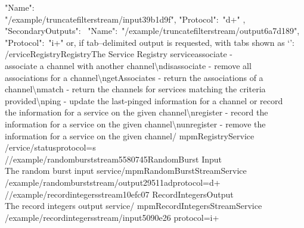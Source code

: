 \textbraceleft{} "Name":\ \\
"/example/truncatefilterstream/input\textunderscore{}39b1d9f", "Protocol":\ "d+"
\textbraceright{} \closeSq,\\
"SecondaryOutputs":\ \openSq{} \textbraceleft{} "Name":\
"/example/truncatefilterstream/output\textunderscore{}6a7d189", "Protocol":\ "i+"
\textbraceright{} \closeSq{} \textbraceright{} \closeSq
\outputEnd{}
or, if tab--delimited output is requested, with tabs shown as
`\texttt{\boldmath{$\vdash$}}':
\outputBegin{}
/\textdollar{}ervice\pseudotab{}Registry\pseudotab{}Registry\pseudotab{}The Service
Registry service\pseudotab{}associate - \\
associate a channel with another channel\textbackslash{}ndisassociate - remove all\\
associations for a channel\textbackslash{}ngetAssociates - return the associations of a\\
channel\textbackslash{}nmatch - return the channels for services matching the criteria\\
provided\textbackslash{}nping - update the last-pinged information for a channel or
record\\
the information for a service on the given channel\textbackslash{}nregister - record the\\
information for a service on the given channel\textbackslash{}nunregister - remove the\\
information for a service on the given channel\pseudotab\textellipsis/%
mpmRegistryService\pseudotwotabs\\
/\textdollar{}ervice/status\textbraceleft{}protocol=s\textbraceright\\

/\serviceName/example/randomburststream\textunderscore{}5580745\pseudotab{}RandomBurst%
\pseudotab{}Input\pseudotab\\
The random burst input service\pseudotwotabs\textellipsis/mpmRandomBurstStreamService%
\pseudotwotabs\\
/example/randomburststream/output\textunderscore{}29511ad\textbraceleft{}protocol=d+%
\textbraceright\\

/\serviceName/example/recordintegersstream\textunderscore{}10efc07\pseudotab{}%
RecordIntegers\pseudotab{}Output\pseudotab\\
The record integers output service\pseudotwotabs\textellipsis/%
mpmRecordIntegersStreamService\pseudotab\\
/example/recordintegersstream/input\textunderscore{}5090e26\textbraceleft{}%
protocol=i+\textbraceright\\

